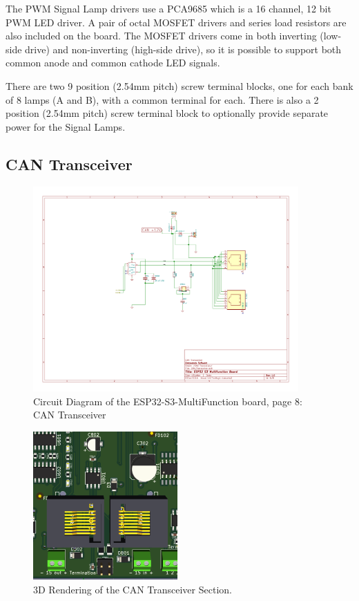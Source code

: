 The PWM Signal Lamp drivers use a PCA9685 which is a 16 channel, 12 bit PWM
LED driver. A pair of octal MOSFET drivers and series load resistors are also
included on the board. The MOSFET drivers come in both inverting (low-side
drive) and non-inverting (high-side drive), so it is possible to support both
common anode and common cathode LED signals. 

There are two 9 position (2.54mm pitch) screw terminal blocks, one for each
bank of 8 lamps (A and B), with a common terminal for each. There is also a 2
position (2.54mm pitch) screw terminal block to optionally provide separate
power for the Signal Lamps.

\subsection{CAN Transceiver}
\begin{figure}[hbpt]\begin{centering}%
\includegraphics[width=4in]{ESP32-S3-MultiFunction-8.pdf}
\caption{Circuit Diagram of the ESP32-S3-MultiFunction board, page 8: CAN 
Transceiver}
\end{centering}\end{figure}
\begin{figure}[hbpt]\begin{centering}%
\includegraphics{ESP32-S3-MultiFunction-top3D-CANTransceiver.png}
\caption{3D Rendering of the CAN Transceiver  Section.}
\end{centering}\end{figure}

